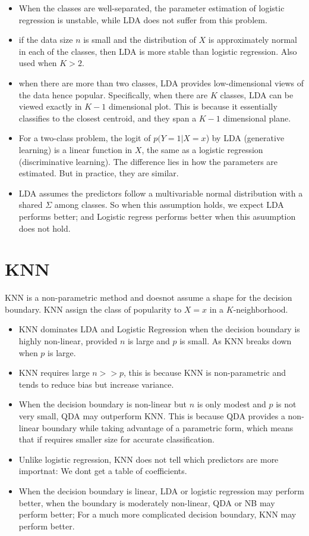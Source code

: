 \documentclass[
  letterpaper,
  DIV=11,
  numbers=noendperiod]{scrreprt}
\providecommand{\tightlist}{%
  \setlength{\itemsep}{0pt}\setlength{\parskip}{0pt}}\usepackage{longtable,booktabs,array}
\begin{document}
\begin{itemize}
\tightlist
\item
  When the classes are well-separated, the parameter estimation of
  logistic regression is unstable, while LDA does not suffer from this
  problem.
\item
  if the data size \(n\) is small and the distribution of \(X\) is
  approximately normal in each of the classes, then LDA is more stable
  than logistic regression. Also used when \(K>2\).
\item
  when there are more than two classes, LDA provides low-dimensional
  views of the data hence popular. Specifically, when there are \(K\)
  classes, LDA can be viewed exactly in \(K-1\) dimensional plot. This
  is because it essentially classifies to the closest centroid, and they
  span a \(K-1\) dimensional plane.
\item
  For a two-class problem, the logit of \(p(Y=1|X=x\)) by LDA
  (generative learning) is a linear function in \(X\), the same as a
  logistic regression (discriminative learning). The difference lies in
  how the parameters are estimated. But in practice, they are similar.
\item
  LDA assumes the predictors follow a multivariable normal distribution
  with a shared \(\Sigma\) among classes. So when this assumption holds,
  we expect LDA performs better; and Logistic regress performs better
  when this asuumption does not hold.
\end{itemize}

\section{KNN}\label{knn}

KNN is a non-parametric method and doesnot assume a shape for the
decision boundary. KNN assign the class of popularity to \(X=x\) in a
\(K\)-neighborhood.

\begin{itemize}
\item
  KNN dominates LDA and Logistic Regression when the decision boundary
  is highly non-linear, provided \(n\) is large and \(p\) is small. As
  KNN breaks down when \(p\) is large.
\item
  KNN requires large \(n>>p\), this is because KNN is non-parametric and
  tends to reduce bias but increase variance.
\item
  When the decision boundary is non-linear but \(n\) is only modest and
  \(p\) is not very small, QDA may outperform KNN. This is because QDA
  provides a non-linear boundary while taking advantage of a parametric
  form, which means that if requires smaller size for accurate
  classification.
\item
  Unlike logistic regression, KNN does not tell which predictors are
  more importnat: We dont get a table of coefficients.
\item
  When the decision boundary is linear, LDA or logistic regression may
  perform better, when the boundary is moderately non-linear, QDA or NB
  may perform better; For a much more complicated decision boundary, KNN
  may perform better.
\end{itemize}
\end{document}
